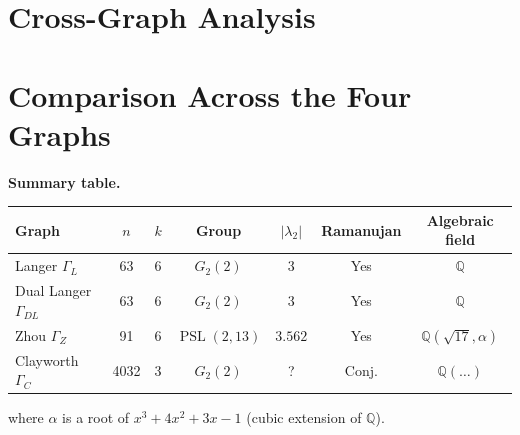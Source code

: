 \documentclass[11pt,a4paper]{article}
\theoremstyle{plain}
\theoremstyle{definition}
\newcommand{\PSL}{\operatorname{PSL}}
\begin{document}
\section*{Cross-Graph Analysis}

\section{Comparison Across the Four Graphs}

\begin{tcolorbox}[breakable, colback=black!5, colframe=black!5,
  boxrule=0pt, sharp corners]
\textbf{Summary table.}
\begin{center}
\begin{tabular}{lcccccc}
\toprule
Graph & $n$ & $k$ & Group & $|\lambda_2|$ & Ramanujan & Algebraic field \\
\midrule
Langer $\Gamma_L$ & 63 & 6 & $G_2(2)$ & 3 & Yes & $\mathbb{Q}$ \\
Dual Langer $\Gamma_{DL}$ & 63 & 6 & $G_2(2)$ & 3 & Yes & $\mathbb{Q}$ \\
Zhou $\Gamma_Z$ & 91 & 6 & $\PSL(2,13)$ & $3.562$ & Yes & $\mathbb{Q}(\sqrt{17}, \alpha)$ \\
Clayworth $\Gamma_C$ & 4032 & 3 & $G_2(2)$ & ? & Conj. & $\mathbb{Q}(\ldots)$ \\
\bottomrule
\end{tabular}
\end{center}
where $\alpha$ is a root of $x^3 + 4x^2 + 3x - 1$ (cubic extension of $\mathbb{Q}$).
\end{tcolorbox}
\end{document}
